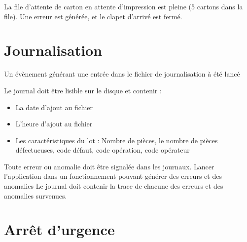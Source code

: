 {La file d'attente de carton en attente d'impression est pleine (5 cartons dans la file).}
{Une erreur est générée, et le clapet d'arrivé est fermé.}

\section{Journalisation}
{Un évènement générant une entrée dans le fichier de journalisation à été lancé}
{Le journal doit être lisible sur le disque et contenir :
\begin{itemize}
	\item La date d'ajout au fichier 
	\item L'heure d'ajout au fichier
	\item Les caractéristiques du lot : Nombre de pièces, le nombre de pièces défectueuses, code défaut, code opération, code opérateur
\end{itemize}
}

{Toute erreur ou anomalie doit être signalée dans les journaux.}
{Lancer l'application dans un fonctionnement pouvant générer des erreurs et des anomalies}
{Le journal doit contenir la trace de chacune des erreurs et des anomalies survenues.}

\section{Arrêt d'urgence}
{}
{}
